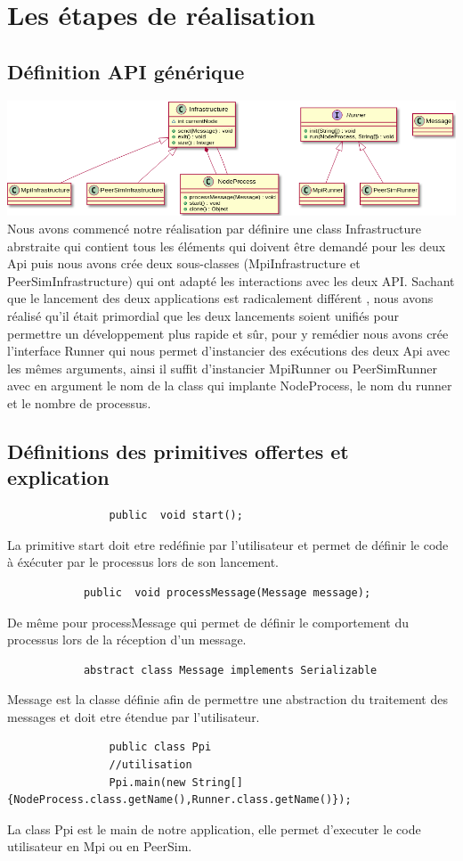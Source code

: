 \documentclass{article}
\begin{document}
		\section{Les étapes de réalisation}
			\subsection{Définition API générique}
			\hspace*{-2cm} \includegraphics[width=19cm]{Ppi_uml.png}
			Nous avons commencé notre réalisation par définire une class Infrastructure abrstraite qui contient tous les éléments qui doivent être demandé pour les deux Api
			puis nous avons crée deux sous-classes (MpiInfrastructure et PeerSimInfrastructure) qui ont adapté les interactions avec les deux API.
			\newline
			Sachant que le lancement des deux applications est radicalement différent 
			, nous avons réalisé qu'il était primordial que les deux 
			lancements soient unifiés pour permettre un développement plus rapide et sûr, pour y remédier nous avons crée l'interface Runner qui nous permet 
			d'instancier des exécutions des deux Api avec les mêmes arguments, ainsi il suffit d'instancier MpiRunner ou PeerSimRunner avec en argument
			le nom de la class qui implante NodeProcess, le nom du runner et le nombre de processus.
			\subsection{Définitions des primitives offertes et explication}
			\begin{lstlisting}
				public  void start();
			\end{lstlisting}
			La primitive start  doit etre redéfinie par l'utilisateur et permet de définir le code à éxécuter par le processus lors de son lancement.
			\begin{lstlisting}
			public  void processMessage(Message message);
			\end{lstlisting}
			De même pour processMessage qui permet  de définir le comportement du processus lors de la réception d'un message.
			\begin{lstlisting}
			abstract class Message implements Serializable
			\end{lstlisting}
			Message est la classe définie afin de permettre une abstraction du traitement des messages et doit etre étendue par l'utilisateur.
			\newpage
			\begin{lstlisting}
				public class Ppi
				//utilisation
				Ppi.main(new String[] {NodeProcess.class.getName(),Runner.class.getName()});
			\end{lstlisting}
			La class Ppi est le main de notre application, elle permet d'executer le code utilisateur en Mpi ou en PeerSim.
\end{document}
